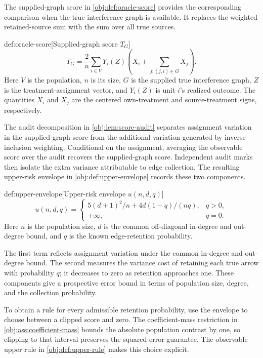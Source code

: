 \documentclass[11pt]{article}
\begin{document}
The supplied-graph score  in \cref{obj:def:oracle-score} provides the corresponding comparison when the true interference graph is available. It replaces the weighted retained-source sum with the sum over all true sources.

\begin{definitionv}{def:oracle-score}[Supplied-graph score $T_G$]
\[
T_G
=
\frac2n\sum_{i\in V}Y_i(Z)
\left(X_i+\sum_{j:(j,i)\in G}X_j\right).
\]
Here \(V\) is the population, \(n\) is its size, \(G\) is the supplied true interference graph, \(Z\) is the treatment-assignment vector, and \(Y_i(Z)\) is unit \(i\)'s realized outcome. The quantities \(X_i\) and \(X_j\) are the centered own-treatment and source-treatment signs, respectively.
\end{definitionv}

The audit decomposition in \cref{obj:lem:score-audit} separates assignment variation in the supplied-graph score from the additional variation generated by inverse-inclusion weighting. Conditional on the assignment, averaging the observable score over the audit recovers the supplied-graph score. Independent audit marks then isolate the extra variance attributable to edge collection. The resulting upper-risk envelope  in \cref{obj:def:upper-envelope} records these two components.

\begin{definitionv}{def:upper-envelope}[Upper-risk envelope $u(n,d,q)$]
\[
u(n,d,q)
=
\begin{cases}
5(d+1)^2/n+4d(1-q)/(nq),&q>0,\\
+\infty,&q=0.
\end{cases}
\]
Here \(n\) is the population size, \(d\) is the common off-diagonal in-degree and out-degree bound, and \(q\) is the known edge-retention probability.
\end{definitionv}

The first term reflects assignment variation under the common in-degree and out-degree bound. The second measures the variance cost of retaining each true arrow with probability \(q\); it decreases to zero as retention approaches one. These components give a prospective error bound in terms of population size, degree, and the collection probability.

To obtain a rule for every admissible retention probability, use the envelope to choose between a clipped score and zero. The coefficient-mass restriction in \cref{obj:ass:coefficient-mass} bounds the absolute population contrast by one, so clipping to that interval preserves the squared-error guarantee. The observable upper rule  in \cref{obj:def:upper-rule} makes this choice explicit.
\end{document}
